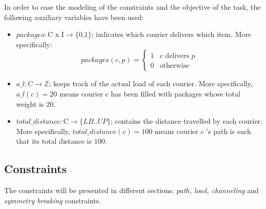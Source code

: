 In order to ease the modeling of the constraints and the objective of the task, the following auxiliary variables have been used:
\begin{itemize}
    \item $packages : \text{C x I} \to \text{\{0,1\}}$;  indicates which courier delivers which item. More specifically:
    \begin{equation} 
    \label{eq:packages}
    packages(c,p) =
    \begin{cases}
        1    & \text{$c$ delivers $p$} \\
        0    & \text{otherwise} 
    \end{cases}
    \end{equation}
    
    \item $a\_l : \text{C} \to \mathbb{Z}$;  keeps track of the actual load of each courier. More specifically, $a\_l(c) = 20$ means courier $c$ has been filled with packages whose total weight is $20$.

    \item $total\_distance : \text{C} \to \{LB..UP\}$;  contains the distance travelled by each courier. More specifically, $total\_distance(c) = 100$ means courier $c$ 's path is such that its total distance is $100$.

\end{itemize}


\subsection{Constraints}
The constraints will be presented in different sections: \textit{path, load, channeling} and \textit{symmetry breaking} constraints.

